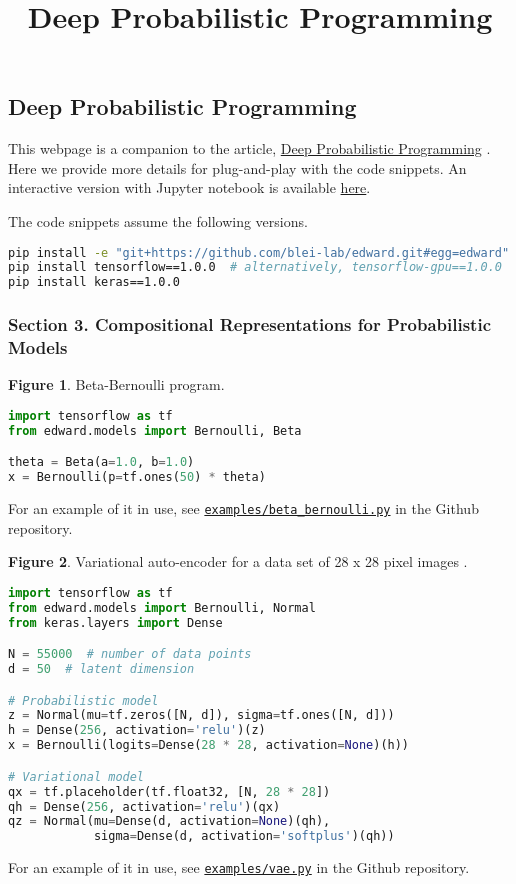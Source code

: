 \title{Deep Probabilistic Programming}

\subsection{Deep Probabilistic Programming}

This webpage is a companion to the article,
\href{https://arxiv.org/abs/1701.03757}{Deep Probabilistic Programming}
\citep{tran2017deep}.
Here we provide more details for plug-and-play with the code snippets.
An interactive version with Jupyter notebook is available
\href{http://nbviewer.jupyter.org/github/blei-lab/edward/blob/master/notebooks/iclr2017.ipynb}{here}.

The code snippets assume the following versions.

\begin{lstlisting}[language=bash]
pip install -e "git+https://github.com/blei-lab/edward.git#egg=edward"
pip install tensorflow==1.0.0  # alternatively, tensorflow-gpu==1.0.0
pip install keras==1.0.0
\end{lstlisting}

\subsubsection{Section 3. Compositional Representations for Probabilistic Models}

\textbf{Figure 1}. Beta-Bernoulli program.
\begin{lstlisting}[language=python]
import tensorflow as tf
from edward.models import Bernoulli, Beta

theta = Beta(a=1.0, b=1.0)
x = Bernoulli(p=tf.ones(50) * theta)
\end{lstlisting}
For an example of it in use, see
\href{https://github.com/blei-lab/edward/blob/master/examples/beta_bernoulli.py}{\texttt{examples/beta_bernoulli.py}}
in the Github repository.

\textbf{Figure 2}. Variational auto-encoder for a data set of 28 x 28 pixel images
\citep{kingma2014auto,rezende2014stochastic}.
\begin{lstlisting}[language=python]
import tensorflow as tf
from edward.models import Bernoulli, Normal
from keras.layers import Dense

N = 55000  # number of data points
d = 50  # latent dimension

# Probabilistic model
z = Normal(mu=tf.zeros([N, d]), sigma=tf.ones([N, d]))
h = Dense(256, activation='relu')(z)
x = Bernoulli(logits=Dense(28 * 28, activation=None)(h))

# Variational model
qx = tf.placeholder(tf.float32, [N, 28 * 28])
qh = Dense(256, activation='relu')(qx)
qz = Normal(mu=Dense(d, activation=None)(qh),
            sigma=Dense(d, activation='softplus')(qh))
\end{lstlisting}
For an example of it in use, see
\href{https://github.com/blei-lab/edward/blob/master/examples/vae.py}{\texttt{examples/vae.py}}
in the Github repository.


